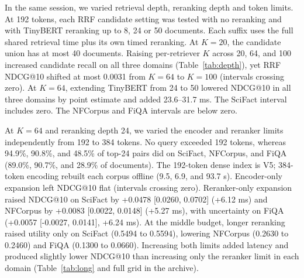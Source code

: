 In the same session, we varied retrieval depth, reranking depth and token limits. At 192 tokens, each RRF candidate setting was tested with no reranking and with TinyBERT reranking up to 8, 24 or 50 documents. Each suffix uses the full shared retrieval time plus its own timed reranking. At $K=20$, the candidate union has at most 40 documents. Raising per-retriever $K$ across 20, 64, and 100 increased candidate recall on all three domains (Table~\ref{tab:depth}), yet RRF NDCG@10 shifted at most 0.0031 from $K=64$ to $K=100$ (intervals crossing zero). At $K=64$, extending TinyBERT from 24 to 50 lowered NDCG@10 in all three domains by point estimate and added 23.6--31.7 ms. The SciFact interval includes zero. The NFCorpus and FiQA intervals are below zero.

At $K=64$ and reranking depth 24, we varied the encoder and reranker limits independently from 192 to 384 tokens. No query exceeded 192 tokens, whereas 94.9\%, 90.8\%, and 48.5\% of top-24 pairs did on SciFact, NFCorpus, and FiQA (89.0\%, 90.7\%, and 28.9\% of documents). The 192-token dense index is V5; 384-token encoding rebuilt each corpus offline (9.5, 6.9, and 93.7 s). Encoder-only expansion left NDCG@10 flat (intervals crossing zero). Reranker-only expansion raised NDCG@10 on SciFact by +0.0478 [0.0260, 0.0702] (+6.12 ms) and NFCorpus by +0.0083 [0.0022, 0.0148] (+5.27 ms), with uncertainty on FiQA (+0.0057 [-0.0027, 0.0141], +6.24 ms). At the middle budget, longer reranking raised utility only on SciFact (0.5494 to 0.5594), lowering NFCorpus (0.2630 to 0.2460) and FiQA (0.1300 to 0.0660). Increasing both limits added latency and produced slightly lower NDCG@10 than increasing only the reranker limit in each domain (Table~\ref{tab:long} and full grid in the archive).
